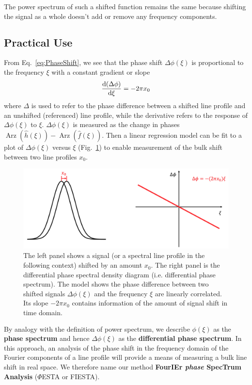 The power spectrum of such a shifted function remains the same because shifting the signal as a whole doesn't add or remove any frequency components. 


\subsection{Practical Use}

From Eq.~\ref{eq:PhaseShift}, we see that the phase shift $\Delta \phi(\xi)$ is proportional to the frequency $\xi$ with a constant gradient or slope
\begin{equation}
	\dv{(\Delta \phi)}{\xi} = -2 \pi x_0
\label{eq:gradient}
\end{equation}
where $\Delta$ is used to refer to the phase difference between a shifted line profile and an unshifted (referenced) line profile, while the derivative refers to the response of $\Delta \phi(\xi)$ to $\xi$. $\Delta \phi(\xi)$ is measured as the change in phases $\operatorname{Arz}(\hat{h}(\xi)) - \operatorname{Arz}(\hat{f}(\xi))$. Then a linear regression model can be fit to a plot of $\Delta \phi(\xi)$ versus $\xi$ (Fig.~\ref{fig:FT}) to enable measurement of the bulk shift between two line profiles $x_0$. 

\begin{figure}[tbp]
\centering
\includegraphics[width = 0.99 \linewidth]
{./Figures/Methods/FT.png}
\caption[Translation property of Fourier transform]
{The left panel shows a signal (or a spectral line profile in the following context) shifted by an amount $x_0$. 
The right panel is the differential phase spectral density diagram (i.e. differential phase spectrum). 
The model shows the phase difference between two shifted signals $\Delta \phi(\xi)$ and the frequency $\xi$ are linearly correlated. Its slope $-2 \pi x_0$ contains information of the amount of signal shift in time domain.}
\label{fig:FT}
\end{figure} 

By analogy with the definition of power spectrum, we describe $\phi(\xi)$ as the \textbf{phase spectrum} and hence $\Delta \phi(\xi)$ as the \textbf{differential phase spectrum}. In this approach, an analysis of the phase shift in the frequency domain of the Fourier components of a line profile will provide a means of measuring a bulk line shift in real space. We therefore name our method \textbf{FourIEr \textit{phase} SpecTrum Analysis} ($\mathit{\Phi}$ESTA or FIESTA). 

